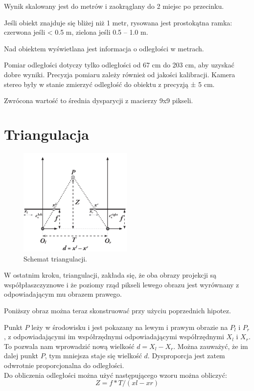\documentclass[magisterska]{pracadypl}
\begin{document}
Wynik skalowany jest do metrów i zaokrąglany do 2 miejsc po przecinku.

Jeśli obiekt znajduje się bliżej niż 1 metr, rysowana jest prostokątna ramka: czerwona jeśli < 0.5 m, zielona jeśli 0.5 – 1.0 m.

Nad obiektem wyświetlana jest informacja o odległości w metrach.

Pomiar odległości dotyczy tylko odległości od 67 cm do 203 cm, aby uzyskać dobre wyniki. Precyzja pomiaru zależy również od jakości kalibracji. Kamera stereo były w stanie zmierzyć odległość do obiektu z precyzją ± 5 cm.

Zwrócona wartość to średnia dysparycji z macierzy 9x9 pikseli.

\section{Triangulacja}

\begin{figure}[H]  %
    \centering  %
    \includegraphics[width=0.5\textwidth]{images/triangulation.png}  %
    \captionsetup{font=footnotesize}
    \caption[Schemat triangulacji. Learning OpenCV 3, O'Reilly, Str. 705]{Schemat triangulacji.}
    \label{fig:rpi}  %
\end{figure}

W ostatnim kroku, triangulacji, zakłada się, że oba obrazy projekcji są współpłaszczyznowe i że poziomy rząd pikseli lewego obrazu jest wyrównany z odpowiadającym mu obrazem prawego.

Poniższy obraz można teraz skonstruować przy użyciu poprzednich hipotez.

Punkt $P$ leży w środowisku i jest pokazany na
lewym i prawym obrazie na $P_l$ i $P_r$, z odpowiadającymi im współrzędnymi
odpowiadającymi współrzędnymi $X_l$ i $X_r$. To pozwala nam wprowadzić nową wielkość $d = X_l - X_r$.
Można zauważyć, że im dalej punkt $P$, tym mniejsza staje się wielkość $d$. Dysproporcja jest zatem odwrotnie proporcjonalna do odległości.\\
Do obliczenia odległości można użyć następującego wzoru można obliczyć: \[Z=f*T/(xl-xr)\]
\end{document}
